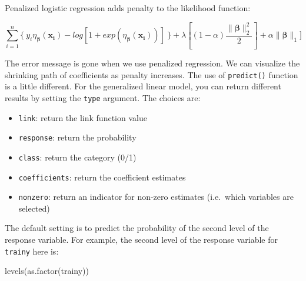\documentclass[
  12pt,
]{krantz}
\makeatletter
\newenvironment{Shaded}{\begin{snugshade}}{\end{snugshade}}
\newcommand{\AttributeTok}[1]{\textcolor[rgb]{0.61,0.61,0.61}{#1}}
\newcommand{\FunctionTok}[1]{\textcolor[rgb]{0,0,0}{#1}}
\newcommand{\NormalTok}[1]{#1}
\newcommand{\OtherTok}[1]{\textcolor[rgb]{0.37,0.37,0.37}{#1}}
\newcommand{\SpecialCharTok}[1]{\textcolor[rgb]{0,0,0}{#1}}
\newcommand{\StringTok}[1]{\textcolor[rgb]{0.5,0.5,0.5}{#1}}
\providecommand{\tightlist}{%
  \setlength{\itemsep}{0pt}\setlength{\parskip}{0pt}}
\newenvironment{kframe}{%
\medskip{}
\setlength{\fboxsep}{.8em}
 \def\at@end@of@kframe{}%
 \ifinner\ifhmode%
  \def\at@end@of@kframe{\end{minipage}}%
  \begin{minipage}{\columnwidth}%
 \fi\fi%
 \def\FrameCommand##1{\hskip\@totalleftmargin \hskip-\fboxsep
 \colorbox{shadecolor}{##1}\hskip-\fboxsep
     \hskip-\linewidth \hskip-\@totalleftmargin \hskip\columnwidth}%
 \MakeFramed {\advance\hsize-\width
   \@totalleftmargin\z@ \linewidth\hsize
   \@setminipage}}%
 {\par\unskip\endMakeFramed%
 \at@end@of@kframe}
\renewenvironment{Shaded}{\begin{kframe}}{\end{kframe}}
\makeatother
\begin{document}
Penalized logistic regression adds penalty to the likelihood function:

\[
\sum_{i=1}^{n}\{\ y_{i}\eta_{\symbf{\beta}}(\mathbf{x_{i}})-log[1+exp(\eta_{\symbf{\beta}}(\mathbf{x_{i}}))]\ \}+\lambda [(1-\alpha) \frac{\parallel \symbf{\beta}\parallel_{2}^{2}}{2}] + \alpha \parallel \symbf{\beta}\parallel _{1} ]
\]

\begin{Shaded}
\end{Shaded}

The error message is gone when we use penalized regression. We can visualize the shrinking path of coefficients as penalty increases. The use of \texttt{predict()} function is a little different. For the generalized linear model, you can return different results by setting the \texttt{type} argument. The choices are:

\begin{itemize}
\tightlist
\item
  \texttt{link}: return the link function value
\item
  \texttt{response}: return the probability
\item
  \texttt{class}: return the category (0/1)
\item
  \texttt{coefficients}: return the coefficient estimates
\item
  \texttt{nonzero}: return an indicator for non-zero estimates (i.e.~which variables are selected)
\end{itemize}

The default setting is to predict the probability of the second level of the response variable. For example, the second level of the response variable for \texttt{trainy} here is:

\begin{Shaded}
\begin{Highlighting}[]
\FunctionTok{levels}\NormalTok{(}\FunctionTok{as.factor}\NormalTok{(trainy))}
\end{Highlighting}
\end{Shaded}
\end{document}
